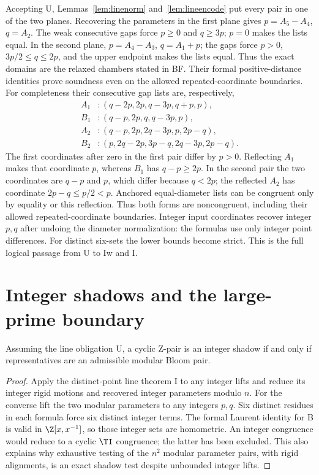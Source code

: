 Accepting U, Lemmas~\ref{lem:linenorm} and~\ref{lem:lineencode} put every
pair in one of the two planes. Recovering the parameters in the first
plane gives $p=A_5-A_4$, $q=A_2$. The weak consecutive gaps force
$p\ge0$ and $q\ge3p$; $p=0$ makes the lists equal. In the second plane,
$p=A_4-A_3$, $q=A_1+p$; the gaps force $p>0$,
$3p/2\le q\le2p$, and the upper endpoint makes the lists equal.
Thus the exact domains are the relaxed chambers stated in BF. Their
formal positive-distance identities prove soundness even on the allowed
repeated-coordinate boundaries. For completeness their consecutive gap
lists are, respectively,
\begin{align*}
 A_1 &: (q-2p,2p,q-3p,q+p,p),\\
 B_1 &: (q-p,2p,q,q-3p,p),\\
 A_2 &: (q-p,2p,2q-3p,p,2p-q),\\
 B_2 &: (p,2q-2p,3p-q,2q-3p,2p-q).
\end{align*}
The first coordinates after zero in the first pair differ by $p>0$.
Reflecting $A_1$ makes that coordinate $p$, whereas $B_1$ has
$q-p\ge2p$. In the second pair the two coordinates are $q-p$ and $p$,
which differ because $q<2p$; the reflected $A_2$ has coordinate
$2p-q\le p/2<p$. Anchored equal-diameter lists can be congruent only by
equality or this reflection. Thus both forms are noncongruent, including
their allowed repeated-coordinate boundaries. Integer input coordinates recover integer
$p,q$ after undoing the diameter normalization: the formulas use only
integer point differences. For distinct six-sets the lower bounds become
strict. This is the full logical passage from U to Iw and I.

\section{Integer shadows and the large-prime boundary}\label{sec:shadowfull}

\begin{proposition}\label{prop:shadowexact}
Assuming the line obligation U, a cyclic Z-pair is an integer shadow
if and only if representatives are an admissible modular Bloom pair.
\end{proposition}
\begin{proof}
Apply the distinct-point line theorem I to any integer lifts and reduce
its integer rigid motions and recovered integer parameters modulo $n$.
For the converse lift the two modular parameters to any integers $p,q$.
Six distinct residues in each formula force six distinct integer terms.
The formal Laurent identity for B is valid in $\Z[x,x^{-1}]$, so those
integer sets are homometric. An integer congruence would reduce to a
cyclic $\TI$ congruence; the latter has been excluded. This also explains
why exhaustive testing of the $n^2$ modular parameter pairs, with rigid
alignments, is an exact shadow test despite unbounded integer lifts.
\end{proof}

